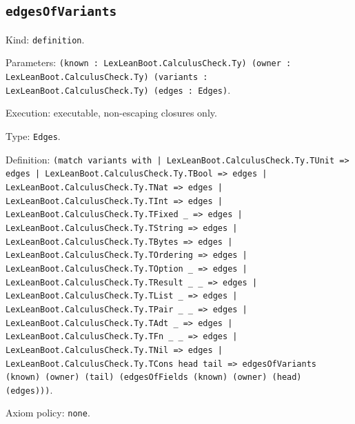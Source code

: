 \documentclass[11pt]{article}
\begin{document}
\subsection*{\texttt{edgesOfVariants}}
\noindent Kind: \texttt{definition}.\par
\noindent Parameters: \texttt{(known : LexLeanBoot.CalculusCheck.Ty) (owner : LexLeanBoot.CalculusCheck.Ty) (variants : LexLeanBoot.CalculusCheck.Ty) (edges : Edges)}.\par
\noindent Execution: executable, non-escaping closures only.\par
\noindent Type: \texttt{Edges}.\par
\noindent Definition: \texttt{(match variants with | LexLeanBoot.CalculusCheck.Ty.TUnit => edges | LexLeanBoot.CalculusCheck.Ty.TBool => edges | LexLeanBoot.CalculusCheck.Ty.TNat => edges | LexLeanBoot.CalculusCheck.Ty.TInt => edges | LexLeanBoot.CalculusCheck.Ty.TFixed \_ => edges | LexLeanBoot.CalculusCheck.Ty.TString => edges | LexLeanBoot.CalculusCheck.Ty.TBytes => edges | LexLeanBoot.CalculusCheck.Ty.TOrdering => edges | LexLeanBoot.CalculusCheck.Ty.TOption \_ => edges | LexLeanBoot.CalculusCheck.Ty.TResult \_ \_ => edges | LexLeanBoot.CalculusCheck.Ty.TList \_ => edges | LexLeanBoot.CalculusCheck.Ty.TPair \_ \_ => edges | LexLeanBoot.CalculusCheck.Ty.TAdt \_ => edges | LexLeanBoot.CalculusCheck.Ty.TFn \_ \_ => edges | LexLeanBoot.CalculusCheck.Ty.TNil => edges | LexLeanBoot.CalculusCheck.Ty.TCons head tail => edgesOfVariants (known) (owner) (tail) (edgesOfFields (known) (owner) (head) (edges)))}.\par
\noindent Axiom policy: \texttt{none}.\par
\end{document}
